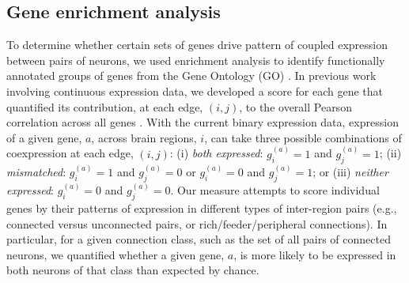 \documentclass[10pt,letterpaper]{article}
\begin{document}

\subsection*{Gene enrichment analysis}
To determine whether certain sets of genes drive pattern of coupled expression between pairs of neurons, we used enrichment analysis to identify functionally annotated groups of genes from the Gene Ontology (GO) \cite{Ashburner2000}.
In previous work involving continuous expression data, we developed a score for each gene that quantified its contribution, at each edge, $(i,j)$, to the overall Pearson correlation across all genes \cite{Fulcher:2016ck}.
With the current binary expression data, expression of a given gene, $a$, across brain regions, $i$, can take three possible combinations of coexpression at each edge, $(i,j)$:
(i) \emph{both expressed}: $g^{(a)}_i = 1$ and $g^{(a)}_j = 1$;
(ii) \emph{mismatched}: $g^{(a)}_i = 1$ and $g^{(a)}_j = 0$ or $g^{(a)}_i = 0$ and $g^{(a)}_j = 1$; or
(iii) \emph{neither expressed}: $g^{(a)}_i = 0$ and $g^{(a)}_j = 0$.
Our measure attempts to score individual genes by their patterns of expression in different types of inter-region pairs (e.g., connected versus unconnected pairs, or rich/feeder/peripheral connections).
In particular, for a given connection class, such as the set of all pairs of connected neurons, we quantified whether a given gene, $a$, is more likely to be expressed in both neurons of that class than expected by chance.
\end{document}
